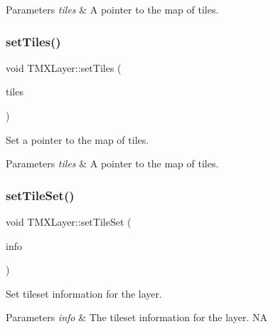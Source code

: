 \begin{DoxyParams}{Parameters}
{\em tiles} & A pointer to the map of tiles. \\
\hline
\end{DoxyParams}
\mbox{\label{classTMXLayer_a5697a3402af12c2cd53ed67e344e5847}} 
\subsubsection{\texorpdfstring{set\+Tiles()}{setTiles()}\hspace{0.1cm}{\footnotesize\ttfamily [2/2]}}
{\footnotesize\ttfamily void T\+M\+X\+Layer\+::set\+Tiles (\begin{DoxyParamCaption}\item[{uint32\+\_\+t $\ast$}]{tiles }\end{DoxyParamCaption})\hspace{0.3cm}{\ttfamily [inline]}}

Set a pointer to the map of tiles.


\begin{DoxyParams}{Parameters}
{\em tiles} & A pointer to the map of tiles. \\
\hline
\end{DoxyParams}
\mbox{\label{classTMXLayer_a97b14b1c69b6bdc5e5fd2b6e99605263}} 
\subsubsection{\texorpdfstring{set\+Tile\+Set()}{setTileSet()}\hspace{0.1cm}{\footnotesize\ttfamily [1/2]}}
{\footnotesize\ttfamily void T\+M\+X\+Layer\+::set\+Tile\+Set (\begin{DoxyParamCaption}\item[{T\+M\+X\+Tileset\+Info $\ast$}]{info }\end{DoxyParamCaption})\hspace{0.3cm}{\ttfamily [inline]}}

Set tileset information for the layer.


\begin{DoxyParams}{Parameters}
{\em info} & The tileset information for the layer.  NA \\
\hline
\end{DoxyParams}
\mbox{\label{classTMXLayer_a97b14b1c69b6bdc5e5fd2b6e99605263}} 

